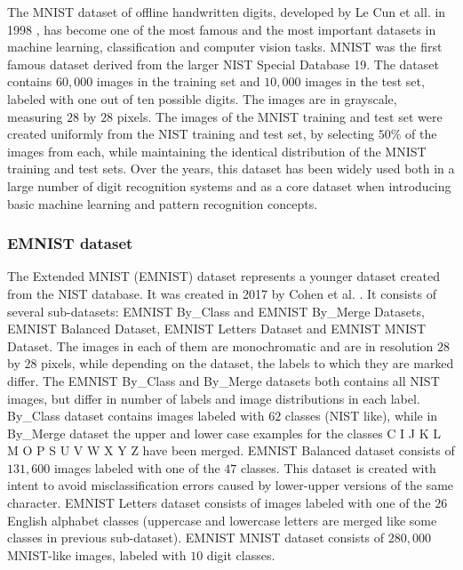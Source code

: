 \documentclass[eng]{simposium}
\begin{document}
The MNIST dataset of offline handwritten digits, developed by Le Cun et all. in 1998 \cite{8}, 
has become one of the most famous and the most important datasets in machine learning,  
classification and computer vision tasks.  
MNIST was the first famous dataset derived from the larger NIST Special Database 19.  
The dataset contains $60,000$ images in the training set and $10,000$ images in the test set, labeled with one out of ten possible digits.  
The images are in grayscale, measuring $28$ by $28$ pixels.  
The images of the MNIST training and test set were created uniformly from the NIST training and test set,  
by selecting $50\%$ of the images from each, while maintaining the identical distribution of the MNIST training and test sets.  
Over the years, this dataset has been widely used both in a large number of digit recognition systems and as a core dataset  
when introducing basic machine learning and pattern recognition concepts.  

\subsubsection{EMNIST dataset} 

The Extended MNIST (EMNIST) dataset represents a younger dataset created from the NIST database.  
It was created in 2017 by Cohen et al. \cite{1}.  
It consists of several sub-datasets: EMNIST By\_Class and EMNIST By\_Merge Datasets, EMNIST Balanced Dataset,  
EMNIST Letters Dataset and EMNIST MNIST Dataset.  
The images in each of them are monochromatic and are in resolution $28$ by $28$ pixels,  
while depending on the dataset, the labels to which they are marked differ.  
The EMNIST By\_Class and By\_Merge datasets both contains all NIST images, but differ in number of labels and image distributions  
in each label. By\_Class dataset contains images labeled with $62$ classes (NIST like), while in By\_Merge dataset  
the upper and lower case examples for the classes C I J K L M O P S U V W X Y Z have been merged.  
EMNIST Balanced dataset consists of $131,600$ images labeled with one of the $47$ classes.  
This dataset is created with intent to avoid misclassification errors caused by lower-upper versions of the same character.  
EMNIST Letters dataset consists of images labeled with one of the $26$ English alphabet classes  
(uppercase and lowercase letters are merged like some classes in previous sub-dataset).  
EMNIST MNIST dataset consists of $280,000$ MNIST-like images, labeled with $10$ digit classes.  
  
\end{document}
